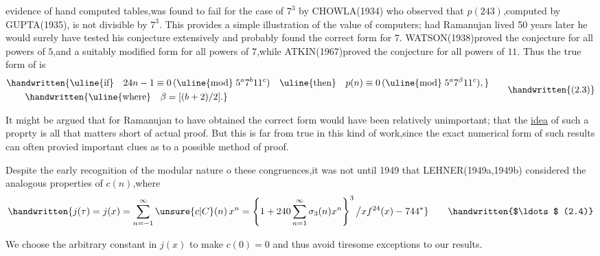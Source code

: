 \noindent evidence of hand computed tables,was found to fail for the case of $7^{3}$ by CHOWLA(1934) who observed that $p(243)$,computed by GUPTA(1935), is not divisible by $7^{3}$. This provides a simple illustration of the value of computers; had Ramanujan lived 50 years later he would surely have tested his conjecture extensively and probably found the correct form for $7$. WATSON(1938)proved the conjecture for all powers of $5$,and a suitably modified form for all powers of $7$,while ATKIN(1967)proved the conjecture for all powers of $11$. Thus the true form of  is
\[
\begin{aligned}
&\handwritten{\text{\uline{if}}\quad 24n-1\equiv0\,(\text{\uline{mod}}\;5^{a}7^{b}11^{c})\quad
\text{\uline{then}}\quad p(n)\equiv0\,(\text{\uline{mod}}\;5^{a}7^{\beta}11^{c}),}\\
&\qquad\handwritten{\text{\uline{where}}\quad \beta=[(b+2)/2].}
\end{aligned}
\tag*{\handwritten{(2.3)}}
\]

It might be argued that for Ramanujan to have obtained the correct form would have been relatively unimportant; that the \uline{idea} of such a proprty is all that matters short of actual proof. But this is far from true in this kind of work,since the exact numerical form of such results can often provied important clues as to a possible method of proof.

Despite the early recognition of the modular nature o these congruences,it was not until 1949 that LEHNER(1949a,1949b) considered the analogous properties of $c(n)$,where
\[
\handwritten{j(\tau)=j(x)=\sum_{n=-1}^{\infty}\unsure{c|C}(n)\,x^{n}
=\left\{1+240\sum_{n=1}^{\infty}\sigma_{3}(n)x^{n}\right\}^{3}\big/xf^{24}(x)-744^{*}}
\tag*{\handwritten{$\ldots$ (2.4)}}
\]

\noindent\handwritten{\rule{\linewidth}{0.4pt}}

\noindent *We choose the arbitrary constant in $j(x)$ to make $c(0)=0$ and thus avoid tiresome exceptions to our results.

